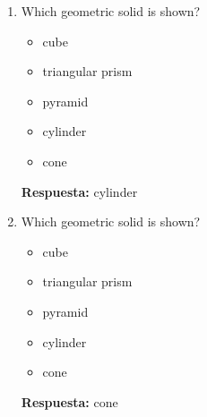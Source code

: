 \documentclass[11pt,a4paper]{article}
\begin{document}
\begin{enumerate}
\begin{itemize}
\item triangular prism
\item pyramid
\item cylinder
\item cone
\end{itemize}
\textbf{Respuesta:} pyramid
\item Which geometric solid is shown?
\begin{center}
\end{center}
\begin{itemize}
\item cube
\item triangular prism
\item pyramid
\item cylinder
\item cone
\end{itemize}
\textbf{Respuesta:} cylinder
\item Which geometric solid is shown?
\begin{center}
\end{center}
\begin{itemize}
\item cube
\item triangular prism
\item pyramid
\item cylinder
\item cone
\end{itemize}
\textbf{Respuesta:} cone
\end{enumerate}
\end{document}

